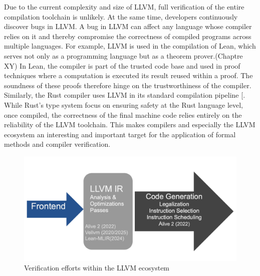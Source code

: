 Due to the current complexity and size of LLVM, full verification of the entire compilation toolchain is unlikely. At the same time, developers continuously discover bugs in LLVM. A bug in LLVM can affect any language whose compiler relies on it and thereby compromise the correctness of compiled programs across multiple languages.
For example, LLVM is used in the compilation of Lean, which serves not only as a programming language but as a theorem prover\cite {}.(Chaptre XY) In Lean, the compiler is part of the trusted code base and used in proof techniques where a computation is executed its result reused within a proof. The soundness of these proofs therefore hinge on the trustworthiness of the compiler.  Similarly, the Rust compiler uses LLVM in its standard compilation pipeline [\cite{Rustlantis}. While Rust's type system focus on ensuring safety at the Rust language level, once compiled, the correctness of the final machine code relies entirely on the reliability of the LLVM toolchain. This makes compilers and especially the LLVM ecosystem an interesting and important target for the application of formal methods and compiler verification.

\begin{figure}[htbp]
  \centering
  \includegraphics[scale=0.35]{thesis/verification_efforts_intro.png}
  \caption{Verification efforts within the LLVM ecosystem}
  \label{fig:your-label}
\end{figure}

